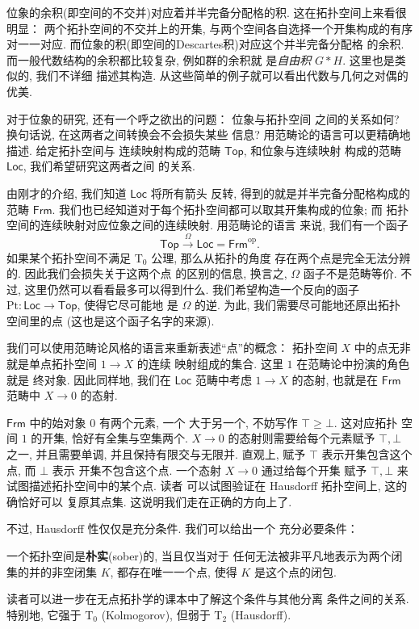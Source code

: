 位象的余积(即空间的不交并)对应着并半完备分配格的积.
这在拓扑空间上来看很明显： 两个拓扑空间的不交并上的开集,
与两个空间各自选择一个开集构成的有序对一一对应.
而位象的积(即空间的Descartes积)对应这个并半完备分配格
的余积. 而一般代数结构的余积都比较复杂, 例如群的余积就
是\emph{自由积} \(G * H\). 这里也是类似的, 我们不详细
描述其构造. 从这些简单的例子就可以看出代数与几何之对偶的
优美.

对于位象的研究, 还有一个呼之欲出的问题： 位象与拓扑空间
之间的关系如何? 换句话说, 在这两者之间转换会不会损失某些
信息? 用范畴论的语言可以更精确地描述. 给定拓扑空间与
连续映射构成的范畴 \(\mathsf{Top}\), 和位象与连续映射
构成的范畴 \(\mathsf{Loc}\), 我们希望研究这两者之间
的关系.

由刚才的介绍, 我们知道 \(\mathsf{Loc}\) 将所有箭头
反转, 得到的就是并半完备分配格构成的范畴 \(\mathsf{Frm}\).
我们也已经知道对于每个拓扑空间都可以取其开集构成的位象; 而
拓扑空间的连续映射对应位象之间的连续映射. 用范畴论的语言
来说, 我们有一个函子
\[\mathsf{Top} \xrightarrow{\Omega} \mathsf{Loc}
= \mathsf{Frm}^{\mathrm{op}}.\]
如果某个拓扑空间不满足 T\(_0\) 公理, 那么从拓扑的角度
存在两个点是完全无法分辨的. 因此我们会损失关于这两个点
的区别的信息, 换言之, \(\Omega\) 函子不是范畴等价.
不过, 这里仍然可以看看最多可以得到什么.
我们希望构造一个反向的函子 \(\mathrm{Pt} :
\mathsf{Loc} \to \mathsf{Top}\), 使得它尽可能地
是 \(\Omega\) 的逆. 为此, 我们需要尽可能地还原出拓扑
空间里的点 (这也是这个函子名字的来源).

我们可以使用范畴论风格的语言来重新表述“点”的概念： 拓扑空间
\(X\) 中的点无非就是单点拓扑空间 \(1 \to X\) 的连续
映射组成的集合. 这里 \(1\) 在范畴论中扮演的角色就是
终对象. 因此同样地, 我们在 \(\mathsf{Loc}\) 范畴中考虑
\(1 \to X\) 的态射, 也就是在 \(\mathsf{Frm}\) 范畴中
\(X \to 0\) 的态射.

\(\mathsf{Frm}\) 中的始对象 \(0\) 有两个元素, 一个
大于另一个, 不妨写作 \(\top \ge \bot\). 这对应拓扑
空间 \(1\) 的开集, 恰好有全集与空集两个.
\(X \to 0\) 的态射则需要给每个元素赋予 \(\top, \bot\)
之一, 并且需要单调, 并且保持有限交与无限并. 直观上,
赋予 \(\top\) 表示开集包含这个点, 而 \(\bot\) 表示
开集不包含这个点. 一个态射 \(X \to 0\) 通过给每个开集
赋予 \(\top,\bot\) 来试图描述拓扑空间中的某个点. 读者
可以试图验证在 Hausdorff 拓扑空间上, 这的确恰好可以
复原其点集. 这说明我们走在正确的方向上了.

不过, Hausdorff 性仅仅是充分条件. 我们可以给出一个
充分必要条件：
\begin{definition}
一个拓扑空间是\textbf{朴实}(sober)的, 当且仅当对于
任何无法被非平凡地表示为两个闭集的并的非空闭集 \(K\),
都存在唯一一个点, 使得 \(K\) 是这个点的闭包.
\end{definition}
读者可以进一步在无点拓扑学的课本中了解这个条件与其他分离
条件之间的关系. 特别地, 它强于 T\(_0\) (Kolmogorov),
但弱于 T\(_2\) (Hausdorff).

